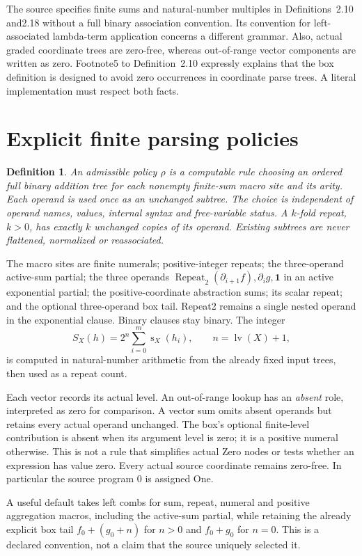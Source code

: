 \documentclass[11pt]{article}
\newtheorem{definition}[theorem]{Definition}
\newcommand{\lv}{\operatorname{lv}}
\newcommand{\sz}{\operatorname{s}}
\newcommand{\Rep}{\operatorname{Repeat}}
\newcommand{\one}{\mathbf1}
\newcommand{\pa}{\partial}
\begin{document}
The source specifies finite sums and natural-number multiples in
Definitions~2.10 and2.18 without a full binary association convention.
Its convention for left-associated lambda-term application concerns a
different grammar. Also, actual graded coordinate trees are zero-free,
whereas out-of-range vector components are written as zero. Footnote5
to Definition~2.10 expressly explains that the box definition is designed
to avoid zero occurrences in coordinate parse trees. A literal
implementation must respect both facts.

\section{Explicit finite parsing policies}

\begin{definition}
An admissible policy $\rho$ is a computable rule choosing an ordered full
binary addition tree for each nonempty finite-sum macro site and its
arity. Each operand is used once as an unchanged subtree. The choice is
independent of operand names, values, internal syntax and free-variable
status. A $k$-fold repeat, $k>0$, has exactly $k$ unchanged copies of
its operand. Existing subtrees are never flattened, normalized or
reassociated.
\end{definition}

The macro sites are finite numerals; positive-integer repeats; the
three-operand active-sum partial; the three operands
$\Rep_2(\pa_{i+1}f),\pa_i g,\one$ in an active exponential partial;
the positive-coordinate abstraction sums; its scalar repeat; and the
optional three-operand box tail. Repeat2 remains a single nested
operand in the exponential clause. Binary clauses stay binary. The
integer
\[
 S_X(h)=2^n\sum_{i=0}^m\sz_X(h_i),
 \qquad n=\lv(X)+1,
\]
is computed in natural-number arithmetic from the already fixed input
trees, then used as a repeat count.

Each vector records its actual level. An out-of-range lookup has an
\emph{absent} role, interpreted as zero for comparison. A vector sum
omits absent operands but retains every actual operand unchanged. The
box's optional finite-level contribution is absent when its argument
level is zero; it is a positive numeral otherwise. This is not a rule
that simplifies actual Zero nodes or tests whether an expression has
value zero. Every actual source coordinate remains zero-free. In
particular the source program $0$ is assigned One.

A useful default takes left combs for sum, repeat, numeral and positive
aggregation macros, including the active-sum partial, while retaining
the already explicit box tail $f_0+(g_0+n)$ for $n>0$ and $f_0+g_0$
for $n=0$. This is a declared convention, not a claim that the source
uniquely selected it.
\end{document}
